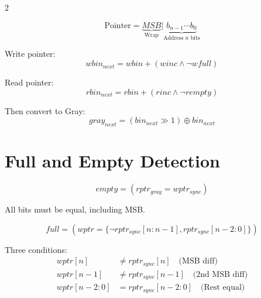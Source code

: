 \documentclass[10pt,landscape]{article}
\begin{document}
\begin{multicols}{2}
\begin{tcolorbox}[colback=green!5,colframe=green!75!black,title=Pointer Structure]
\begin{equation*}
\text{Pointer} = \underbrace{MSB}_{\text{Wrap}} | \underbrace{b_{n-1} \cdots b_0}_{\text{Address $n$ bits}}
\end{equation*}
\end{tcolorbox}

\begin{tcolorbox}[colback=green!5,colframe=green!75!black,title=Pointer Increment]
Write pointer:
\begin{equation*}
wbin_{next} = wbin + (winc \land \neg wfull)
\end{equation*}

Read pointer:
\begin{equation*}
rbin_{next} = rbin + (rinc \land \neg rempty)
\end{equation*}

Then convert to Gray:
\begin{equation*}
gray_{next} = (bin_{next} \gg 1) \oplus bin_{next}
\end{equation*}
\end{tcolorbox}

\section*{Full and Empty Detection}

\begin{tcolorbox}[colback=red!5,colframe=red!75!black,title=Empty Condition]
\begin{equation*}
\boxed{empty = (rptr_{gray} = wptr_{sync})}
\end{equation*}

All bits must be equal, including MSB.
\end{tcolorbox}

\begin{tcolorbox}[colback=red!5,colframe=red!75!black,title=Full Condition]
\begin{equation*}
\boxed{full = (wptr = \{\neg rptr_{sync}[n:n-1], rptr_{sync}[n-2:0]\})}
\end{equation*}

Three conditions:
\begin{align*}
wptr[n] &\neq rptr_{sync}[n] \quad \text{(MSB diff)} \\
wptr[n-1] &\neq rptr_{sync}[n-1] \quad \text{(2nd MSB diff)} \\
wptr[n-2:0] &= rptr_{sync}[n-2:0] \quad \text{(Rest equal)}
\end{align*}
\end{tcolorbox}


\end{multicols}
\end{document}
